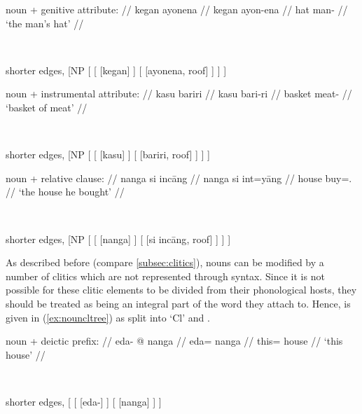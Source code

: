 \a %
	\begin{minipage}[t]{.5\linewidth}
	\begingl
		\glpreamble noun + genitive attribute: //
		\gla kegan ayonena //
		\glb kegan ayon-ena //
		\glc hat man-\Gen{} //
		\glft `the man's hat' //
	\endgl
	\end{minipage}
	~
	\begin{forest} shorter edges,
	[NP
		[
			[
				[{kegan}]
			]
			[{}
				[{ayonena}, roof]
			]
		]
	]
	\end{forest}

\a %
	\begin{minipage}[t]{.5\linewidth}
	\begingl
		\glpreamble noun + instrumental attribute: //
		\gla kasu bariri //
		\glb kasu bari-ri //
		\glc basket meat-\Ins{} //
		\glft `basket of meat' //
	\endgl
	\end{minipage}
	~
	\begin{forest} shorter edges,
	[NP
		[
			[
				[{kasu}]
			]
			[{}
				[{bariri}, roof]
			]
		]
	]
	\end{forest}

\a %
	\begin{minipage}[t]{.5\linewidth}
	\begingl
		\glpreamble noun + relative clause: //
		\gla nanga si incāng //
		\glb nanga si int=yāng //
		\glc house \Rel{} buy=\TsgM{}.\Aarg{} //
		\glft `the house he bought' //
	\endgl
	\end{minipage}
	~
	\begin{forest} shorter edges,
	[NP
		[
			[
				[{nanga}]
			]
			[{}
				[{si incāng}, roof]
			]
		]
	]
	\end{forest}

\xe

As described before (compare \autoref{subsec:clitics}), nouns can be modified
by a number of clitics which are not represented through syntax. Since it is
not possible for these clitic elements to be divided from their phonological
hosts, they should be treated as being an integral part of the word they attach
to. Hence,  is given in (\ref{ex:nouncltree}) as split into `Cl' and
.

\pex\label{ex:nouncltree}
\a %
	\begin{minipage}[t]{.5\linewidth}
	\begingl
		\glpreamble noun + deictic prefix: //
		\gla eda- @ nanga //
		\glb eda= nanga //
		\glc this= house //
		\glft `this house' //
	\endgl
	\end{minipage}
	~
	\begin{forest} shorter edges,
	[
		[
			[eda-]
		]
		[
			[nanga]
		]
	]
	\end{forest}


